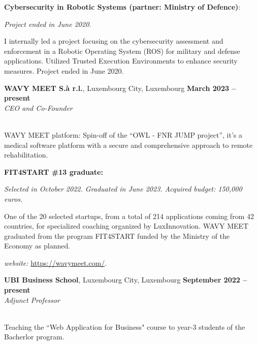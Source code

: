 \documentclass[margin,line]{resume}
\begin{document}
\begin{resume}
\begin{list2}
	\item \filbreak\textbf{Cybersecurity in Robotic Systems (partner: Ministry of Defence)}: 
	
	\emph{Project ended in June 2020.}	
		
	I internally led a project focusing on the cybersecurity assessment and enforcement in a Robotic Operating System (ROS) for military and defense applications. Utilized Trusted Execution Environments to enhance security measures. Project ended in June 2020.

\end{list2}

\textbf{WAVY MEET S.à r.l.}, Luxembourg City, Luxembourg \hfill \textbf{March 2023 -- present}\\
\textit{CEO and Co-Founder}\hfill\\
\vspace{-3mm}\\\vspace{-1mm}
\begin{list2}
	\item \filbreak WAVY MEET platform: Spin-off of the ``OWL - FNR JUMP project'', it's a medical software platform with a secure and comprehensive approach to remote rehabilitation.
	\item \filbreak\textbf{FIT4START \#13 graduate:} 
	
	\emph{Selected in October 2022. Graduated in June 2023. Acquired budget: 150,000 euros.}
	
	One of the 20 selected startups, from a total of 214 applications coming from 42 countries, for specialized coaching organized by LuxInnovation. WAVY MEET graduated from the program FIT4START funded by the Ministry of the Economy as planned.
	
	\item \filbreak\textit{website:} \url{https://wavymeet.com/}.
\end{list2}

\textbf{UBI Business School}, Luxembourg City, Luxembourg \hfill \textbf{September 2022 -- present}\\
\textit{Adjunct Professor}\hfill\\
\vspace{-3mm}\\\vspace{-1mm}
\begin{list2}
	\item \filbreak Teaching the ``Web Application for Business" course to year-3 students of the Bacherlor program.
	\end{list2}



\end{resume}
\end{document}
